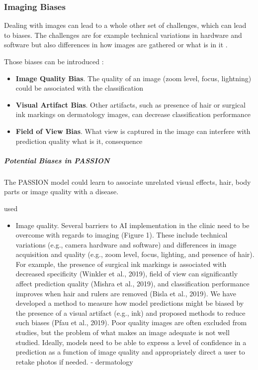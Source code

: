 \documentclass[12pt, a4paper, oneside]{book}   	%
\renewcommand{\paragraph}[1]{%
	\subsubsection*{#1}%
}
\newif\ifrawcitationactive
\newcommand{\rawcitationstart}{
	\color{purple}\rawcitationactivetrue
}
\newcommand{\rawcitationend}{
	\color{black}\rawcitationactivefalse
}
\newcommand{\rawcitationusedstart}{\color{violet}}
\newcommand{\rawcitationusedend}{%
	\ifrawcitationactive
	\color{purple}  %
	\else
	\color{black}  %
	\fi
}
\begin{document}
			
			\paragraph{Imaging Biases}
			Dealing with images can lead to a whole other set of challenges, which can lead to biases. The challenges are for example technical variations in hardware and software but also differences in how images are gathered or what is in it \autocite{Young_2020}.

			Those biases can be introduced :
			\begin{itemize}
				\item \textbf{Image Quality Bias}. The quality of an image (zoom level, focus, lightning) could be associated with the classification \autocite{Young_2020}
				\item \textbf{Visual Artifact Bias}. Other artifacts, such as presence of hair or surgical ink markings on dermatology images, can decrease classification performance \autocite{Winkler et al., 2019 & Bisla et al., 2019 (from Young_2020)}
				\item \textbf{Field of View Bias}. What view is captured in the image can interfere with prediction quality  what is it, consequence \autocite{Mishra et al., 2019 from Young_2020}
			\end{itemize}
			
			
			\subparagraph{Potential Biases in PASSION}
			The PASSION model could learn to associate unrelated visual effects, hair, body parts or image quality with a disease.
			
			
			\rawcitationstart
			used
			\begin{itemize}		
				\rawcitationusedstart
				\item Image quality. Several barriers to AI implementation in the clinic need to be overcome with regards to imaging (Figure 1). These include technical variations (e.g., camera hardware and software) and differences in image acquisition and quality (e.g., zoom level, focus, lighting, and presence of hair). For example, the presence of surgical ink markings is associated with decreased specificity (Winkler et al., 2019), field of view can significantly affect prediction quality (Mishra et al., 2019), and classification performance improves when hair and rulers are removed (Bisla et al., 2019). We have developed a method to measure how model predictions might be biased by the presence of a visual artifact (e.g., ink) and proposed methods to reduce such biases (Pfau et al., 2019). Poor quality images are often excluded from studies, but the problem of what makes an image adequate is not well studied. Ideally, models need to be able to express a level of confidence in a prediction as a function of image quality and appropriately direct a user to retake photos if needed. \autocite{Young_2020} - dermatology
				\rawcitationusedend
			\end{itemize}
			\rawcitationend
			
\end{document}
